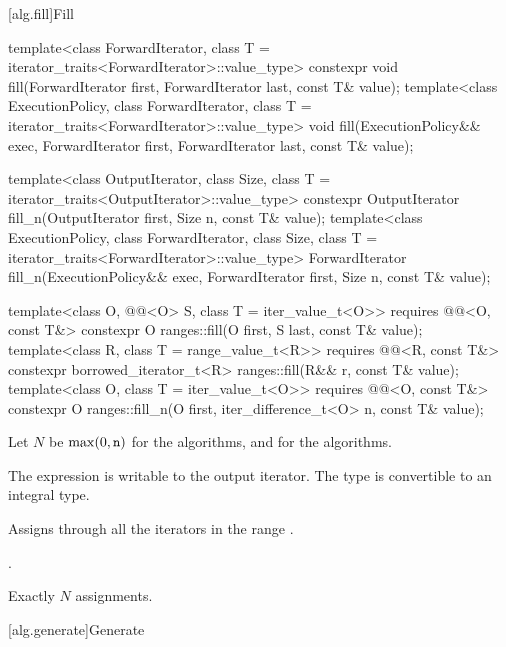 [alg.fill]{Fill}

%
%
\begin{itemdecl}
template<class ForwardIterator, class T = iterator_traits<ForwardIterator>::value_type>
  constexpr void fill(ForwardIterator first, ForwardIterator last, const T& value);
template<class ExecutionPolicy, class ForwardIterator,
         class T = iterator_traits<ForwardIterator>::value_type>
  void fill(ExecutionPolicy&& exec,
            ForwardIterator first, ForwardIterator last, const T& value);

template<class OutputIterator, class Size, class T = iterator_traits<OutputIterator>::value_type>
  constexpr OutputIterator fill_n(OutputIterator first, Size n, const T& value);
template<class ExecutionPolicy, class ForwardIterator, class Size,
         class T = iterator_traits<ForwardIterator>::value_type>
  ForwardIterator fill_n(ExecutionPolicy&& exec,
                         ForwardIterator first, Size n, const T& value);

template<class O, @@<O> S, class T = iter_value_t<O>>
  requires @@<O, const T&>
  constexpr O ranges::fill(O first, S last, const T& value);
template<class R, class T = range_value_t<R>>
  requires @@<R, const T&>
  constexpr borrowed_iterator_t<R> ranges::fill(R&& r, const T& value);
template<class O, class T = iter_value_t<O>>
  requires @@<O, const T&>
  constexpr O ranges::fill_n(O first, iter_difference_t<O> n, const T& value);
\end{itemdecl}

\begin{itemdescr}
\pnum
Let $N$ be $\max(0, \texttt{\protect n})$ for the  algorithms, and
 for the  algorithms.

\pnum
\mandates
The expression 
is writable to the output iterator.
The type  is convertible
to an integral type.

\pnum
\effects
Assigns 
through all the iterators in the range .

\pnum
\returns
{}.

\pnum
\complexity
Exactly $N$ assignments.
\end{itemdescr}

[alg.generate]{Generate}

